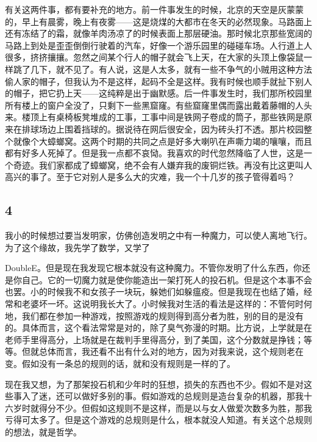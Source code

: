 有关这两件事，都有要补充的地方。前一件事发生的时候，北京的天空是灰蒙蒙的，早上有晨雾，晚上有夜雾——这是烧煤的大都市在冬天的必然现象。马路面上还有冻结了的霜，就像羊肉汤凉了的时候表面上那层硬油。那时候北京那些宽阔的马路上到处是歪歪倒倒行驶着的汽车，好像一个游乐园里的碰碰车场。人行道上人很多，挤挤攘攘。忽然之间某个行人的帽子就会飞上天，在大家的头顶上像袋鼠一样跳了几下，就不见了。有人说，这是人太多，就有一些不争气的小贼用这种方法偷人家的帽子，但我认为不是这样，起码不全是这样。我有时候也顺手就扯下别人的帽子，把它扔上天——这纯粹是出于幽默感。后一件事发生时，我们那所校园里所有楼上的窗户全没了，只剩下一些黑窟窿。有些窟窿里偶而露出戴着藤帽的人头来。楼顶上有桌椅板凳堆成的工事，工事中间是铁网子卷成的筒子，那些铁网是原来在排球场边上围着挡球的。据说待在网后很安全，因为砖头打不透。那片校园整个就像个大蟑螂窝。这两个时期的共同之点是好多大喇叭在声嘶力竭的嚷嚷，而且都有好多人死掉了。但是我一点都不哀恸。我喜欢的时代忽然降临了人世，这是一个奇迹。我们家都成了蟑螂窝，绝不会有人嫌弃我的废铜烂铁。再没有比这更叫人高兴的事了。至于它对别人是多么大的灾难，我一个十几岁的孩子管得着吗？ 

\subsection{4} 

我小的时候想过要当发明家，仿佛创造发明之中有一种魔力，可以使人离地飞行。为了这个缘故，我先学了数学，又学了 

DoubleE。但是现在我发现它根本就没有这种魔力。不管你发明了什么东西，你还是你自己。它的一切魔力就是使你能造出一架打死人的投石机。但是这个本事不会也罢。小的时候我不和女孩子一块玩，躲她们如躲瘟疫。但是我现在也结了婚，经常和老婆坏一坏。这说明我长大了。小时候我对生活的看法是这样的：不管何时何地，我们都在参加一种游戏，按照游戏的规则得到高分者为胜，别的目的是没有的。具体而言，这个看法常常是对的，除了臭气弥漫的时期。比方说，上学就是在老师手里得高分，上场就是在裁判手里得高分，到了美国，这个分数就是挣钱；等等。但就总体而言，我还看不出有什么对的地方，因为对我来说，这个规则老在变。假如没有一条总的规则的话，就和没有规则是一样的了。 

现在我又想，为了那架投石机和少年时的狂想，损失的东西也不少。假如不是对这些事入了迷，还可以做好多别的事。假如游戏的总规则是造台复杂的机器，那我十六岁时就得分不少。但假如这规则不是这样，而是以与女人做爱次数多为胜，那我亏得可太多了。但是这个游戏的总规则是什么，根本就没人知道。有关这个总规则的想法，就是哲学。 

